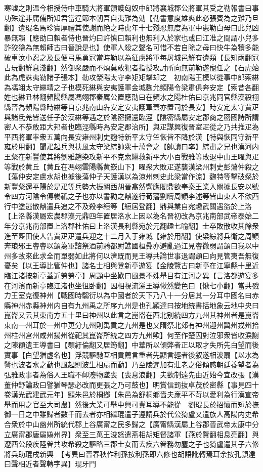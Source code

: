 寒嘘之則温今相授侍中車騎大將軍領護匈奴中郎將襄城郡公將軍其受之勒報書曰事功殊途非腐儒所知君當逞節本朝吾自夷難為効【勒書意度雄爽此必張賓為之難乃旦翻】遺琨名馬珍寶厚禮其使謝而絶之時虎年十七殘忍無度為軍中患勒白母曰此兒凶暴無賴【應劭曰賴者恃也晉灼曰許慎曰賴利也無利入於家也或曰江准之間謂小兒多詐狡獪為無賴師古曰晉說是也】使軍人殺之聲名可惜不若自除之母曰快牛為犢多能破車汝小忍之及長便弓馬勇冠當時勒以為征虜將軍每屠城邑鮮有遺類【長知兩翻冠古玩翻鮮息淺翻】然御衆嚴而不煩莫敢犯者指授攻討所向無前勒遂寵任之【石虎始此為虎誅夷勒諸子張本】勒攻滎陽太守李矩矩擊却之　初南陽王模以從事中郎索綝為馮翊太守綝靖之子也模死綝與安夷護軍金城麴允頻陽令梁肅俱奔安定【索昔各翻姓也綝丑林翻頻陽縣屬馮翊郡秦厲公置應劭曰在頻水之陽杜佑曰京兆同官縣漢祋祤縣晉為頻陽縣時綝等自京兆南山犇安定安夷護軍蓋亦置司於長安】時安定太守賈疋與諸氐羌皆送任子於漢綝等遇之於隂密擁還臨涇【隂密縣屬安定郡商之密國詩所謂密人不恭敢距大邦者也臨涇縣時為安定郡治所】與疋謀興復晉室疋從之乃共推疋為平西將軍率衆五萬向長安雍州刺史麴特新平太守竺恢皆不降於漢【特與恢同守新平雍於用翻】聞疋起兵與扶風太守梁綜帥衆十萬會之【帥讀曰率】綜肅之兄也漢河内王粲在新豐使其將劉雅趙染攻新平不克索綝救新平大小百戰雅等敗退中山王曜與疋等戰於黄丘【黄丘在馮翊雲陽縣黄嶔山下】曜衆大敗疋遂襲漢梁州刺史彭蕩仲殺之【蕩仲安定盧水胡也據後蕩仲子天護漢以為涼州刺史此梁當作涼】麴特等擊破粲於新豐粲還平陽於是疋等兵勢大振關西胡晉翕然響應閻鼎欲奉秦王業入關據長安以號令四方河隂令傅暢祇之子也亦以書勸之鼎遂行荀藩劉疇周顗李述等皆山東人不欲西行中塗逃散鼎遣兵追之不及殺李絙等【絙居登翻】鼎與業自宛趣武關遇盜於上洛【上洛縣漢屬宏農郡漢元鼎四年置居洛水上因以為名晉初改為京兆南部武帝泰始二年分京兆南部置上洛郡杜佑曰上洛漢長利縣宛於元翻趣七喻翻】士卒敗散收其餘衆進至藍田使人告賈疋疋遣兵迎之十二月入于雍城【雍於用翻】使梁綜將兵衛之周顗奔琅邪王睿睿以顗為軍諮祭酒前騎都尉譙國桓彞亦避亂過江見睿微弱謂顗曰我以中州多故來此求全而單弱如此將何以濟既而見王導共論世事退謂顗曰向見管夷吾無復憂矣【以王導比管仲也】諸名士相與登新亭遊宴【金陵覽古曰新亭在江寧縣十里近臨江渚按新亭蓋近勞勞亭】周顗中坐歎曰風景不殊舉目有江河之異【言洛都遊宴多在河濱而新亭臨江渚也坐徂卧翻】因相視流涕王導愀然變色曰【愀七小翻】當共戮力王室克復神州【戰國時騶衍以為中國者於天下乃八十一分居其一分耳中國名曰赤縣神州赤縣神州内自有九州禹之所序九州是也孔頴達曰按地統書括地象云地中央曰崑崙又云其東南方五十里曰神州以此言之崑崙在西北别統四方九州其神州者是崑崙東南一州耳於一州中更分九州則禹貢之九州是也又隋祭北郊有神州迎州冀州戎州拾州柱州宫州咸州揚州從祀其崑崙所統之四方九州歟】何至作楚囚對泣邪衆皆收淚謝之陳頵遺王導書曰【頵紆倫翻又居筠翻】中華所以傾弊者正以取才失所先白望而後實事【白望猶虚名也】浮競驅馳互相貢薦言重者先顯言輕者後叙遂相波扇【以水為譬也波者水之動也風起則波生相扇而動】乃至陵遲加有莊老之俗傾惑朝廷養望者為弘雅政事者為俗人王職不卹灋物墜喪【喪息浪翻】夫欲制遠先由近始今宜改張【漢董仲舒論政曰譬猶琴瑟必改而更張之乃可鼓也】明賞信罰抜卓茂於密縣【事見四十卷漢光武建武元年】顯朱邑於桐鄉【朱邑為舒桐鄉嗇夫亷平不苛以愛利為行漢宣帝舉而用之官至大司農】然後大業可舉中興可冀耳導不能從　劉琨長於招懷而短於撫御一日之中雖歸者數千而去者亦相繼琨遣子遵請兵於代公猗盧又遣族人高陽内史希合衆於中山幽州所統代郡上谷廣甯之民多歸之【廣甯縣漢屬上谷郡晉武帝太康中分立廣甯郡唐屬媯州界】衆至三萬王浚怒遣燕相胡矩督諸軍【燕於賢翻相息亮翻】與遼西公段疾陸眷共攻希殺之驅略三郡士女而去疾六眷務勿塵之子也猗盧遣其子六修將兵助琨戌新興　【考異曰晉春秋作利孫按利孫即六修也胡語訛轉焉耳余按孔頴達曰聲相近者聲轉字異】琨牙門